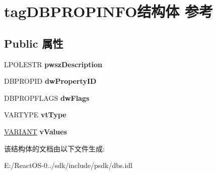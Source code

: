 \hypertarget{structtag_d_b_p_r_o_p_i_n_f_o}{}\section{tag\+D\+B\+P\+R\+O\+P\+I\+N\+F\+O结构体 参考}
\label{structtag_d_b_p_r_o_p_i_n_f_o}
\subsection*{Public 属性}
\begin{DoxyCompactItemize}
\item 
\mbox{\label{structtag_d_b_p_r_o_p_i_n_f_o_a80393ea25350a32f45563b1b373e686c}} 
L\+P\+O\+L\+E\+S\+TR {\bfseries pwsz\+Description}
\item 
\mbox{\label{structtag_d_b_p_r_o_p_i_n_f_o_ac6aecebbe6fb7d0e22b13c6b0a1d17b3}} 
D\+B\+P\+R\+O\+P\+ID {\bfseries dw\+Property\+ID}
\item 
\mbox{\label{structtag_d_b_p_r_o_p_i_n_f_o_a96d91d9cd0faafde3fde7ef9bf7665cb}} 
D\+B\+P\+R\+O\+P\+F\+L\+A\+GS {\bfseries dw\+Flags}
\item 
\mbox{\label{structtag_d_b_p_r_o_p_i_n_f_o_a9021c7a1e45d560363ab47773d4e4ef3}} 
V\+A\+R\+T\+Y\+PE {\bfseries vt\+Type}
\item 
\mbox{\label{structtag_d_b_p_r_o_p_i_n_f_o_a4173c07e82226e7513a264102eee35b7}} 
\hyperlink{structtag_v_a_r_i_a_n_t}{V\+A\+R\+I\+A\+NT} {\bfseries v\+Values}
\end{DoxyCompactItemize}


该结构体的文档由以下文件生成\+:\begin{DoxyCompactItemize}
\item 
E\+:/\+React\+O\+S-\/0../sdk/include/psdk/dbs.\+idl\end{DoxyCompactItemize}
